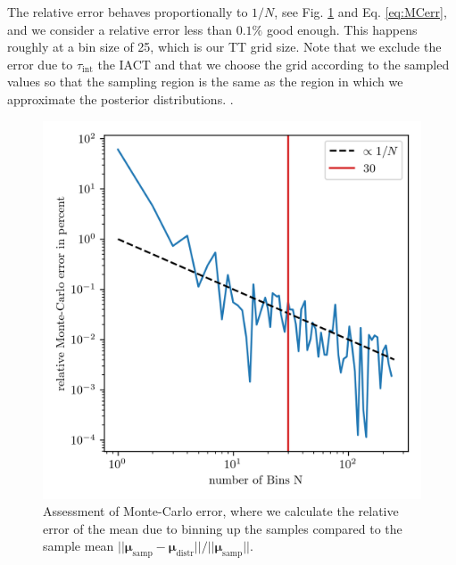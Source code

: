 The relative error behaves proportionally to $1/N$, see Fig. \ref{fig:MCError} and Eq. \ref{eq:MCerr}, and we consider a relative error less than $0.1\%$ good enough.
This happens roughly at a bin size of 25, which is our TT grid size.
Note that we exclude the error due to $\tau_{\text{int}}$ the IACT and that we choose the grid according to the sampled values so that the sampling region is the same as the region in which we approximate the posterior distributions.
.\begin{figure}[ht!]
	\centering
	\includegraphics{MeanAssPT.png}
	\caption[Assessment of Monte-Carlo error.]{Assessment of Monte-Carlo error, where we calculate the relative error of the mean due to binning up the samples compared to the sample mean $||\bm{\mu}_{\text{samp}} -\bm{\mu}_{\text{distr}} ||/ || \bm{\mu}_{\text{samp}}||$.}
	\label{fig:MCError}
\end{figure}

